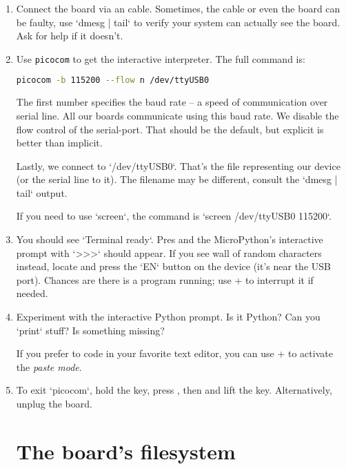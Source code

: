 \documentclass{../tutorial}
\begin{document}
\begin{enumerate}
\item
    Connect the  board via an  cable.
    Sometimes, the cable or even the board can be faulty,
    use `dmesg | tail` to verify your system can actually see the board.
    Ask for help if it doesn't.

\item
    Use \texttt{picocom} to get the interactive interpreter.
    The full command is:

    \begin{lstlisting}[language=bash]
    picocom -b 115200 --flow n /dev/ttyUSB0
    \end{lstlisting}

    The first number specifies the baud rate -- a speed of communication over serial line.
    All our  boards communicate using this baud rate.
    We disable the flow control of the serial-port.
    That should be the default,
    but explicit is better than implicit.

    Lastly, we connect to `/dev/ttyUSB0`.
    That's the file representing our device (or the serial line to it).
    The filename may be different, consult the `dmesg | tail` output.

    If you need to use `screen`,
    the command is `screen /dev/ttyUSB0 115200`.

\item
    You should see `Terminal ready`.
    Pres  and the MicroPython's interactive prompt with `>>>` should appear.
    If you see wall of random characters instead,
    locate and press the `EN` button on the device
    (it's near the USB port).
    Chances are there is a program running;
    use + to interrupt it if needed.

\item
    Experiment with the interactive Python prompt. Is it Python?
    Can you `print` stuff? Is something missing?

    If you prefer to code in your favorite text editor,
    you can use + to activate the \emph{paste mode}.

\item
    To exit `picocom`, hold the  key, press ,
    then  and lift the  key.
    Alternatively, unplug the board.

\section{The board's filesystem}


\end{enumerate}
\end{document}
